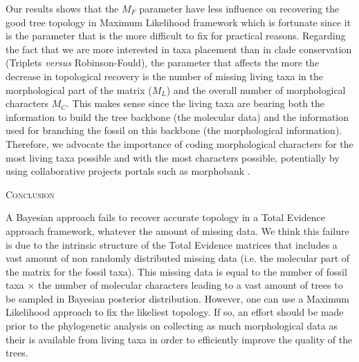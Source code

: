 \documentclass[12pt,letterpaper]{article}
\renewcommand{\section}[1]{%
\bigskip
\begin{center}
\begin{Large}
\normalfont\scshape #1
\medskip
\end{Large}
\end{center}}
\begin{document}
Our results shows that the $M_F$ parameter have less influence on recovering the good tree topology in Maximum Likelihood framework which is fortunate since it is the parameter that is the more difficult to fix for practical reasons.
Regarding the fact that we are more interested in taxa placement than in clade conservation (Triplets \textit{versus} Robinson-Fould), the parameter that affects the more the decrease in topological recovery is the number of missing living taxa in the morphological part of the matrix ($M_L$) and the overall number of morphological characters $M_C$.
This makes sense since the living taxa are bearing both the information to build the tree backbone (the molecular data) and the information used for branching the fossil on this backbone (the morphological information).
Therefore, we advocate the importance of coding morphological characters for the most living taxa possible and with the most characters possible, potentially by using collaborative projects portals such as morphobank \citep{morphobank}.  







%
%


\section{Conclusion}
A Bayesian approach fails to recover accurate topology in a Total Evidence approach framework, whatever the amount of missing data.
We think this failure is due to the intrinsic structure of the Total Evidence matrices that includes a vast amount of non randomly distributed missing data (i.e. the molecular part of the matrix for the fossil taxa).
This missing data is equal to the number of fossil taxa $\times$ the number of molecular characters leading to a vast amount of trees to be sampled in Bayesian posterior distribution.
However, one can use a Maximum Likelihood approach to fix the likeliest topology.
If so, an effort should be made prior to the phylogenetic analysis on collecting as much morphological data as their is available from living taxa in order to efficiently improve the quality of the trees.

\end{document}
